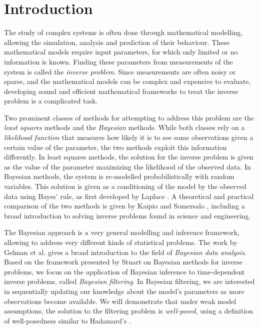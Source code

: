 \section{Introduction}
\setcounter{page}{1}
\thispagestyle{empty}

The study of complex systems is often done through mathematical modelling, allowing the simulation, analysis and prediction of their behaviour. These mathematical models require input parameters, for which only limited or no information is known. Finding these parameters from measurements of the system is called the \textit{inverse problem}. Since measurements are often noisy or sparse, and the mathematical models can be complex and expensive to evaluate, developing sound and efficient mathematical frameworks to treat the inverse problem is a complicated task.

Two prominent classes of methods for attempting to address this problem are the \textit{least squares} methods and the \textit{Bayesian} methods. While both classes rely on a \textit{likelihood function} that measures how likely it is to see some observations given a certain value of the parameter, the two methods exploit this information differently. In least squares methods, the solution for the inverse problem is given as the value of the parameter maximizing the likelihood of the observed data. In Bayesian methods, the system is re-modelled probabilistically with random variables. This solution is given as a conditioning of the model by the observed data using Bayes' rule, as first developed by Laplace \cite{laplace1820theorie}. A theoretical and practical comparison of the two methods is given by Kaipio and Somersalo \cite{kaipio2006statistical}, including a broad introduction to solving inverse problems found in science and engineering. 

The Bayesian approach is a very general modelling and inference framework, allowing to address very different kinds of statistical problems. The work by Gelman et al. \cite[Chapter 1]{gelman} gives a broad introduction to the field of \textit{Bayesian data analysis}. Based on the framework presented by Stuart \cite{stuart_2010} on Bayesian methods for inverse problems, we focus on the application of Bayesian inference to time-dependent inverse problems, called \textit{Bayesian filtering}. In Bayesian filtering, we are interested in sequentially updating our knowledge about the model's parameters as more observations become available. We will demonstrate that under weak model assumptions, the solution to the filtering problem is \textit{well-posed}, using a definition of well-posedness similar to Hadamard's \cite{hadamard}.

